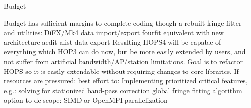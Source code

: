 \documentclass[8pt]{beamer}
\begin{document}
\begin{frame}{Budget}


\begin{outline}
    \1 Budget has sufficient margins to complete coding though a rebuilt fringe-fitter and utilities:
        \2 DiFX/Mk4 data import/export
        \2 fourfit equivalent with new architecture
        \2 aedit
        \2 alist
        \2 data export
    \1 Resulting HOPS4 will be capable of everything which HOP3 can do now, but be more easily extended by users, and not suffer from artificial bandwidth/AP/station limitations. 
    Goal is to refactor HOPS so it is easily extendable without requiring changes to core libraries.
    \1 If resources are pressured:
        \2 best effort to:
            \3 Implementing prioritized critical features, e.g.:
            \3 solving for stationized band-pass correction
            \3 global fringe fitting algorithm
        \2 option to de-scope:
            \3 SIMD or OpenMPI parallelization
\end{outline}

\end{frame}




\end{document}
